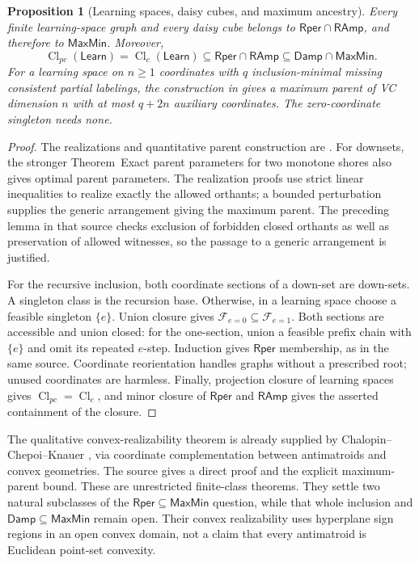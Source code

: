 \documentclass[11pt]{article}
\newtheorem{proposition}{Proposition}[section]
\theoremstyle{definition}
\newcommand{\MaxMin}{\mathsf{MaxMin}}
\newcommand{\Damp}{\mathsf{Damp}}
\newcommand{\RAmp}{\mathsf{RAmp}}
\newcommand{\Rper}{\mathsf{Rper}}
\newcommand{\Cl}{\operatorname{Cl}}
\begin{document}
\begin{proposition}[Learning spaces, daisy cubes, and maximum ancestry]
\label{prop:learning-daisy-maxmin}
Every finite learning-space graph and every daisy cube belongs to
$\Rper\cap\RAmp$, and therefore to $\MaxMin$. Moreover,
\[
 \Cl_{pc}(\mathsf{Learn})=\Cl_c(\mathsf{Learn})
 \subseteq\Rper\cap\RAmp\subseteq\Damp\cap\MaxMin.
\]
For a learning space on $n\ge1$ coordinates with $q$ inclusion-minimal
missing consistent partial labelings, the construction in \cite{MaxParents}
gives a maximum parent of VC dimension $n$ with at most $q+2n$ auxiliary
coordinates. The zero-coordinate singleton needs none.
\end{proposition}
\begin{proof}
The realizations and quantitative parent construction are
\cite[the explicit downset realization and
Theorem~\textnormal{Maximum parents of learning spaces}]{MaxParents}.
For downsets, the stronger Theorem~\textnormal{Exact parent parameters
for two monotone shores} also gives optimal parent parameters.
The realization proofs use strict linear inequalities to realize
exactly the allowed orthants; a bounded perturbation supplies the generic
arrangement giving the maximum parent. The preceding lemma in that source
checks exclusion of forbidden closed orthants as well as preservation of
allowed witnesses, so the passage to a generic arrangement is justified.

For the recursive inclusion, both coordinate sections of a down-set are
down-sets. A singleton class is the recursion base. Otherwise, in a
learning space choose a feasible singleton $\{e\}$.
Union closure gives $\mathcal F_{e=0}\subseteq\mathcal F_{e=1}$.
Both sections are accessible and union closed: for the one-section, union
a feasible prefix chain with $\{e\}$ and omit its repeated $e$-step.
Induction gives $\Rper$ membership, as in the same source. Coordinate
reorientation handles graphs without a prescribed root; unused coordinates
are harmless. Finally, projection closure of learning spaces gives
$\Cl_{pc}=\Cl_c$, and minor closure of $\Rper$ and $\RAmp$ gives the
asserted containment of the closure.
\end{proof}

The qualitative convex-realizability theorem is already supplied by
Chalopin--Chepoi--Knauer \cite[Theorem~26]{CCKGeometry}, via coordinate
complementation between antimatroids and convex geometries. The source
\cite{MaxParents} gives a direct proof and the explicit maximum-parent bound.
These are unrestricted finite-class theorems. They settle two natural
subclasses of the $\Rper\subseteq\MaxMin$ question, while that whole
inclusion and $\Damp\subseteq\MaxMin$ remain open. Their convex
realizability uses hyperplane sign regions in an open convex domain,
not a claim that every antimatroid is Euclidean point-set convexity.
\end{document}
